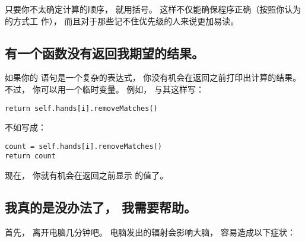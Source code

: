只要你不太确定计算的顺序， 就用括号。  这样不仅能确保程序正确（按照你认为的方式工
作）， 而且对于那些记不住优先级的人来说更加易读。  


\subsection{有一个函数没有返回我期望的结果。  }



如果你的  语句是一个复杂的表达式， 你没有机会在返回之前打印出计算的结果。  
不过， 你可以用一个临时变量。  例如， 与其这样写：

\begin{lstlisting}
return self.hands[i].removeMatches()
\end{lstlisting}


不如写成：

\begin{lstlisting}
count = self.hands[i].removeMatches()
return count
\end{lstlisting}


现在， 你就有机会在返回之前显示  的值了。  


\subsection{我真的是没办法了， 我需要帮助。}


首先， 离开电脑几分钟吧。  
电脑发出的辐射会影响大脑， 容易造成以下症状：

